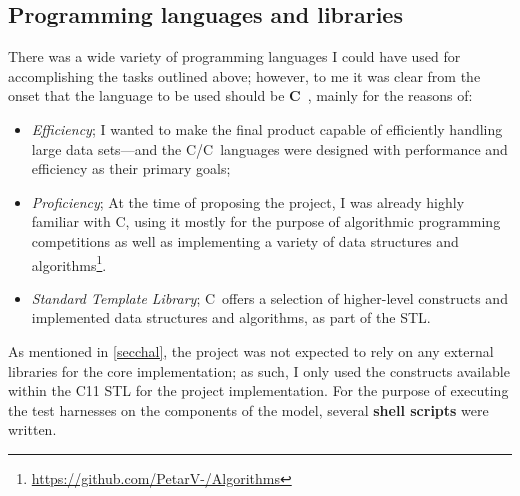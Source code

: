 \documentclass[12pt,a4paper,twoside,openright]{report}
\def\CC{{C\nolinebreak[4]\hspace{-.05em}\raisebox{.4ex}{\tiny\bf ++}}}
\begin{document}
\subsection{Programming languages and libraries}

There was a wide variety of programming languages I could have used for accomplishing the tasks outlined above; however, to me it was clear from the onset that the language to be used should be \textbf{\CC}\ \cite{Stroustrup:2000:CPL:518791}, mainly for the reasons of:
\begin{itemize}
	\item \emph{Efficiency}; I wanted to make the final product capable of efficiently handling large data sets---and the C/\CC\ languages were designed with performance and efficiency as their primary goals;
	\item \emph{Proficiency}; At the time of proposing the project, I was already highly familiar with \CC, using it mostly for the purpose of algorithmic programming competitions as well as implementing a variety of data structures and algorithms\footnote{\url{https://github.com/PetarV-/Algorithms}}. 
	\item \emph{Standard Template Library}; \CC\ offers a selection of higher-level constructs and implemented data structures and algorithms, as part of the STL.
\end{itemize}
As mentioned in \cref{secchal}, the project was not expected to rely on any external libraries for the core implementation; as such, I only used the constructs available within the \CC11 STL for the project implementation. For the purpose of executing the test harnesses on the components of the model, several {\bf shell scripts} were written.
\end{document}
